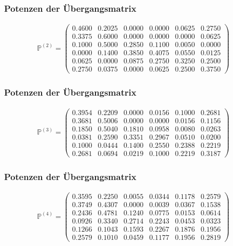 \documentclass[compress]{beamer}
\begin{document}
\begin{frame}
	\frametitle{Potenzen der Übergangsmatrix}
	\begin{center}
		\begin{align*}
			\mathbb{P} ^{(2)} =
			\begin{pmatrix}
				0.4600 & 0.2025 & 0.0000 & 0.0000 & 0.0625 & 0.2750 \\
				0.3375 & 0.6000 & 0.0000 & 0.0000 & 0.0000 & 0.0625 \\
				0.1000 & 0.5000 & 0.2850 & 0.1100 & 0.0050 & 0.0000 \\
				0.0000 & 0.1400 & 0.3850 & 0.4075 & 0.0550 & 0.0125 \\
				0.0625 & 0.0000 & 0.0875 & 0.2750 & 0.3250 & 0.2500 \\
				0.2750 & 0.0375 & 0.0000 & 0.0625 & 0.2500 & 0.3750
			\end{pmatrix}
		\end{align*}
	\end{center}
\end{frame}

\begin{frame}
	\frametitle{Potenzen der Übergangsmatrix}
	\begin{center}
		\begin{align*}
			\mathbb{P} ^{(3)} =
			\begin{pmatrix}
				0.3954 & 0.2209 & 0.0000 & 0.0156 & 0.1000 & 0.2681 \\
				0.3681 & 0.5006 & 0.0000 & 0.0000 & 0.0156 & 0.1156 \\
				0.1850 & 0.5040 & 0.1810 & 0.0958 & 0.0080 & 0.0263 \\
				0.0381 & 0.2590 & 0.3351 & 0.2967 & 0.0510 & 0.0200 \\
				0.1000 & 0.0444 & 0.1400 & 0.2550 & 0.2388 & 0.2219 \\
				0.2681 & 0.0694 & 0.0219 & 0.1000 & 0.2219 & 0.3187
			\end{pmatrix}
		\end{align*}
	\end{center}
\end{frame}


\begin{frame}
	\frametitle{Potenzen der Übergangsmatrix}
	\begin{center}
		\begin{align*}
			\mathbb{P} ^{(4)} =
			\begin{pmatrix}
				0.3595 & 0.2250 & 0.0055 & 0.0344 & 0.1178 & 0.2579 \\
				0.3749 & 0.4307 & 0.0000 & 0.0039 & 0.0367 & 0.1538 \\
				0.2436 & 0.4781 & 0.1240 & 0.0775 & 0.0153 & 0.0614 \\
				0.0926 & 0.3340 & 0.2714 & 0.2243 & 0.0453 & 0.0323 \\
				0.1266 & 0.1043 & 0.1593 & 0.2267 & 0.1876 & 0.1956 \\
				0.2579 & 0.1010 & 0.0459 & 0.1177 & 0.1956 & 0.2819
			\end{pmatrix}
		\end{align*}
	\end{center}
\end{frame}
\end{document}
